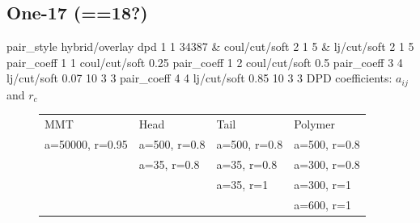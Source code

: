 \documentclass[a4paper]{article}
\begin{document}
\subsection*{One-17 (==18?)}
pair\_style hybrid/overlay dpd 1 1 34387 \& coul/cut/soft 2 1 5 \& 
lj/cut/soft 2 1 5\newline
pair\_coeff 1 1 coul/cut/soft 0.25
pair\_coeff 1 2 coul/cut/soft 0.5\newline
pair\_coeff 3 4 lj/cut/soft 0.07    10 3 3\newline
pair\_coeff 4 4 lj/cut/soft 0.85    10 3 3\newline
DPD coefficients: $a_{ij}$ and $r_c$
\begin{figure}[H]\begin{tabular}{llll}
MMT             & Head         & Tail         & Polymer      \\
a=50000, r=0.95 & a=500, r=0.8 & a=500, r=0.8 & a=500, r=0.8 \\
                & a=35,  r=0.8 & a=35,  r=0.8 & a=300, r=0.8 \\
                &              & a=35,  r=1   & a=300, r=1   \\
                &              &              & a=600, r=1   \\
\end{tabular}\end{figure}
\end{document}
